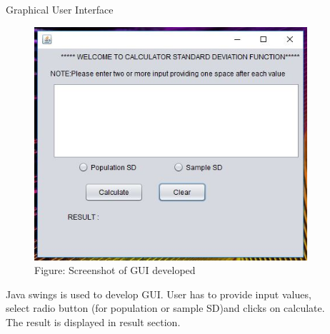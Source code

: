 \documentclass[final]{beamer}
\newlength{\sepwid}
\newlength{\onecolwid}
\newlength{\twocolwid}
\begin{document}
\begin{frame}
\begin{columns}[t]
\begin{column}{\twocolwid}
\begin{columns}[t,totalwidth=\twocolwid]
\begin{column}{\onecolwid}

\end{column} %

\end{columns} %

\end{column} %

\begin{column}{\sepwid}\end{column} %

\begin{column}{\onecolwid} %


\begin{exampleblock}{Graphical User Interface}
\begin{figure}
\includegraphics[width=1\linewidth]{GUI.JPG}\\
Figure: Screenshot of GUI developed \\
\end{figure}
Java swings is used to develop GUI. User has to provide input values, select radio button (for population or sample SD)and clicks on calculate. The result is displayed in result section. 
\end{exampleblock}


\end{column}
\end{columns}
\end{frame}
\end{document}
